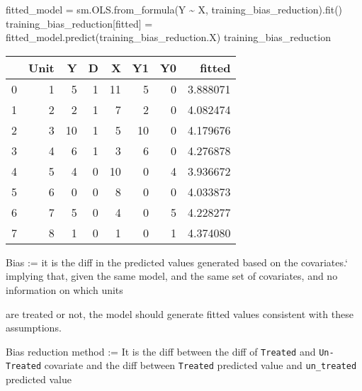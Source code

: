 \documentclass[
  letterpaper,
  DIV=11,
  numbers=noendperiod]{scrartcl}
\newenvironment{Shaded}{\begin{snugshade}}{\end{snugshade}}
\newcommand{\NormalTok}[1]{\textcolor[rgb]{0.00,0.23,0.31}{#1}}
\newcommand{\OperatorTok}[1]{\textcolor[rgb]{0.37,0.37,0.37}{#1}}
\newcommand{\StringTok}[1]{\textcolor[rgb]{0.13,0.47,0.30}{#1}}
\begin{document}
\begin{Shaded}
\begin{Highlighting}[]
\NormalTok{fitted\_model }\OperatorTok{=}\NormalTok{ sm.OLS.from\_formula(}\StringTok{\textquotesingle{}Y \textasciitilde{} X\textquotesingle{}}\NormalTok{, training\_bias\_reduction).fit()}
\NormalTok{training\_bias\_reduction[}\StringTok{\textquotesingle{}fitted\textquotesingle{}}\NormalTok{] }\OperatorTok{=}\NormalTok{  fitted\_model.predict(training\_bias\_reduction.X)}
\NormalTok{training\_bias\_reduction}
\end{Highlighting}
\end{Shaded}

\begin{tabular}{lrrrrrrr}
\toprule
{} &  Unit &   Y &  D &   X &  Y1 &  Y0 &    fitted \\
\midrule
0 &     1 &   5 &  1 &  11 &   5 &   0 &  3.888071 \\
1 &     2 &   2 &  1 &   7 &   2 &   0 &  4.082474 \\
2 &     3 &  10 &  1 &   5 &  10 &   0 &  4.179676 \\
3 &     4 &   6 &  1 &   3 &   6 &   0 &  4.276878 \\
4 &     5 &   4 &  0 &  10 &   0 &   4 &  3.936672 \\
5 &     6 &   0 &  0 &   8 &   0 &   0 &  4.033873 \\
6 &     7 &   5 &  0 &   4 &   0 &   5 &  4.228277 \\
7 &     8 &   1 &  0 &   1 &   0 &   1 &  4.374080 \\
\bottomrule
\end{tabular}

Bias := it is the diff in the predicted values generated based on the
covariates.` implying that, given the same model, and the same set of
covariates, and no information on which units

are treated or not, the model should generate fitted values consistent
with these assumptions.

Bias reduction method := It is the diff between the diff of
\texttt{Treated} and \texttt{Un-Treated} covariate and the diff between
\texttt{Treated} predicted value and \texttt{un\_treated} predicted
value
\end{document}
